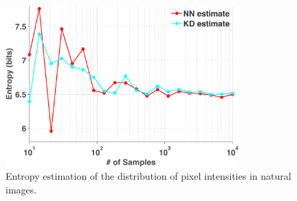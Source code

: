 \documentclass[10pt,twocolumn,letterpaper]{article}
\begin{document}
\begin{figure}
\begin{center}
   \includegraphics[width=0.8\textwidth]{nongaussian_1D.png}
   \caption{Entropy estimation of the distribution of pixel intensities in natural images.}
\end{center}
\label{fig:ng1d}
\end{figure}


\end{document}
